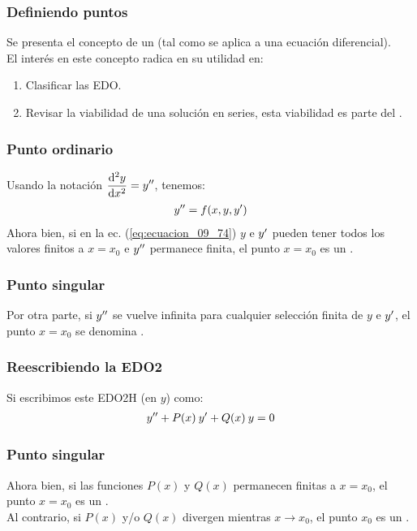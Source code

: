 \documentclass[12pt]{beamer}
\begin{document}
\begin{frame}
\frametitle{Definiendo puntos}
Se presenta el concepto de un  (tal como se aplica a una ecuación diferencial).
\\
\bigskip
\pause
El interés en este concepto radica en su utilidad en:
\pause
{}
\begin{enumerate}[<+->]
\item Clasificar las EDO.
\item Revisar la viabilidad de una solución en series, esta viabilidad es parte del .
\end{enumerate}
\end{frame}
\begin{frame}
\frametitle{Punto ordinario}
Usando la notación $\displaystyle \dv[2]{y}{x} = {y}^{\prime \prime}$, tenemos:
\pause
\begin{align}
{y}^{\prime \prime} = f (x, y, {y}^{\prime})
\label{eq:ecuacion_09_74}
\end{align}
\pause
Ahora bien, si en la ec. (\ref{eq:ecuacion_09_74}) $y$ e ${y}^{\prime}$ pueden tener todos los valores finitos a $x = x_{0}$ e ${y}^{\prime \prime}$ permanece finita, \pause el punto $x = x_{0}$ es un .
\end{frame}
\begin{frame}
\frametitle{Punto singular}
Por otra parte, si ${y}^{\prime \prime}$ se vuelve infinita para cualquier selección finita de $y$ e ${y}^{\prime}$, \pause el punto $x = x_{0}$ se denomina .
\end{frame}
\begin{frame}
\frametitle{Reescribiendo la EDO2}
Si escribimos este EDO2H (en $y$) como:
\pause
\begin{align}
{y}^{\prime \prime} + P (x) \: {y}^{\prime} + Q (x) \: y = 0
\label{eq:ecuacion_09_75}
\end{align}
\end{frame}
\begin{frame}
\frametitle{Punto singular}
Ahora bien, si las funciones $P (x)$ y $Q (x)$ permanecen finitas a $x = x_{0}$, el punto $x = x_{0}$ es un .
\\
\bigskip
\pause
Al contrario, si $P (x)$ y/o $Q (x)$ divergen mientras $x \to x_{0}$, el punto $x_{0}$ es un .
\end{frame}
\end{document}
